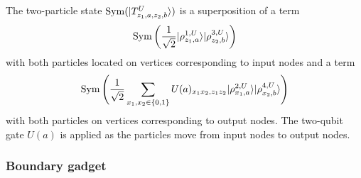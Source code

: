 \documentclass[../thesis-main/thesis-main]{subfiles}
\begin{document}
The two-particle state $\operatorname{Sym}(|T_{z_{1},a,z_{2},b}^{U}\rangle)$ is a superposition of a term
\[
\operatorname{Sym}\bigg(\frac{1}{\sqrt{2}}|\rho_{z_{1},a}^{1,U}\rangle|\rho_{z_{2},b}^{3,U}\rangle\bigg)
\]
with both particles located on vertices corresponding to input nodes and a term 
\[
\operatorname{Sym}\Bigg(\frac{1}{\sqrt{2}}\sum_{x_{1},x_{2}\in\{0,1\}}U(a)_{x_{1}x_{2},z_{1}z_{2}}|\rho_{x_{1},a}^{2,U}\rangle|\rho_{x_{2},b}^{4,U}\rangle\Bigg)
\]
with both particles on vertices corresponding to output nodes. The two-qubit gate $U(a)$
is applied as the particles move from input nodes to output nodes.

\subsubsection{Boundary gadget}
\end{document}
